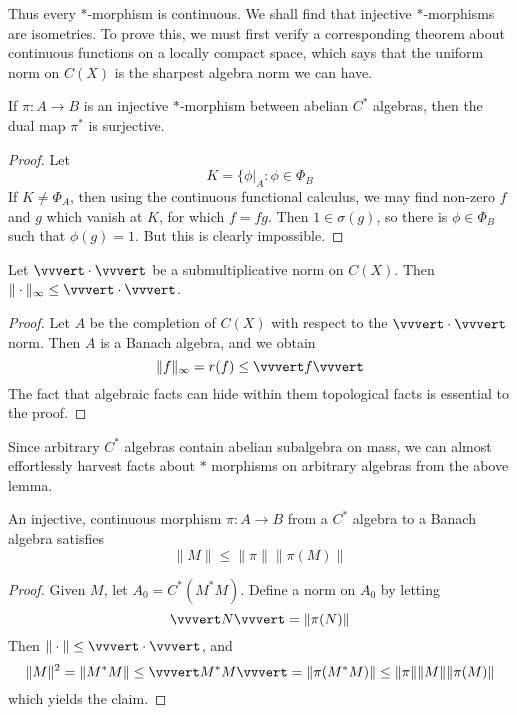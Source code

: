Thus every $*$-morphism is continuous. We shall find that injective $*$-morphisms are isometries. To prove this, we must first verify a corresponding theorem about continuous functions on a locally compact space, which says that the uniform norm on $C(X)$ is the sharpest algebra norm we can have.

\begin{lemma}
    If $\pi: A \to B$ is an injective $*$-morphism between abelian $C^*$ algebras, then the dual map $\pi^*$ is surjective.
\end{lemma}
\begin{proof}
    Let
    \[ K = \{ \phi|_A : \phi \in \Phi_B \]
    If $K \neq \Phi_A$, then using the continuous functional calculus, we may find non-zero $f$ and $g$ which vanish at $K$, for which $f = fg$. Then $1 \in \sigma(g)$, so there is $\phi \in \Phi_B$ such that $\phi(g) = 1$. But this is clearly impossible.
\end{proof}

\begin{lemma}
    Let $\vvvert \cdot \vvvert$ be a submultiplicative norm on $C(X)$. Then $\| \cdot \|_\infty \leq \vvvert \cdot \vvvert$.
\end{lemma}
\begin{proof}
    Let $A$ be the completion of $C(X)$ with respect to the $\vvvert \cdot \vvvert$ norm. Then $A$ is a Banach algebra, and we obtain
    \[ \| f \|_\infty = r(f) \leq \vvvert f \vvvert \]
    The fact that algebraic facts can hide within them topological facts is essential to the proof.
\end{proof}

Since arbitrary $C^*$ algebras contain abelian subalgebra on mass, we can almost effortlessly harvest facts about $*$ morphisms on arbitrary algebras from the above lemma.

\begin{prop}
    An injective, continuous morphism $\pi: A \to B$ from a $C^*$ algebra to a Banach algebra satisfies
    \[ \| M \| \leq \| \pi \| \| \pi(M) \| \]
\end{prop}
\begin{proof}
    Given $M$, let $A_0 = C^*(M^*M)$. Define a norm on $A_0$ by letting
    \[ \vvvert N \vvvert = \| \pi(N) \| \]
    Then $\| \cdot \| \leq \vvvert \cdot \vvvert$, and
    \[ \| M \|^2 = \| M^*M \| \leq \vvvert M^*M \vvvert = \| \pi(M^*M) \| \leq \| \pi \| \| M \| \| \pi(M) \| \]
    which yields the claim.
\end{proof}

